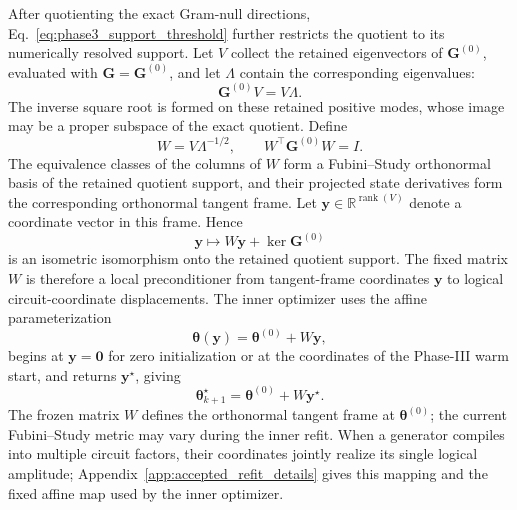 \documentclass[
  reprint,
  amsmath,
  amssymb,
  aps,
  pra,
  nofootinbib,
  superscriptaddress,
  floatfix
]{revtex4-2}
\begin{document}
After quotienting the exact Gram-null directions,
Eq.~\eqref{eq:phase3_support_threshold} further restricts the quotient to its
numerically resolved support. Let \(V\) collect the retained eigenvectors of
\(\mathbf G^{(0)}\), evaluated with \(\mathbf G=\mathbf G^{(0)}\), and let
\(\Lambda\) contain the corresponding eigenvalues:
\[
\mathbf G^{(0)}V=V\Lambda.
\]
The inverse square root is formed on these retained positive modes, whose
image may be a proper subspace of the exact quotient. Define
\begin{equation}
W=V\Lambda^{-1/2},
\qquad
W^{\top}\mathbf G^{(0)}W=I.
\label{eq:accepted_refit_whitening}
\end{equation}
The equivalence classes of the columns of \(W\) form a Fubini--Study
orthonormal basis of the retained quotient support, and their projected state
derivatives form the corresponding orthonormal tangent frame. Let
\(\mathbf y\in\mathbb R^{\operatorname{rank}(V)}\) denote a coordinate vector
in this frame. Hence
\[
\mathbf y
\longmapsto
W\mathbf y+\ker\mathbf G^{(0)}
\]
is an isometric isomorphism onto the retained quotient support. The fixed
matrix \(W\) is therefore a local preconditioner from tangent-frame
coordinates \(\mathbf y\) to logical circuit-coordinate displacements. The
inner optimizer uses the affine parameterization
\[
\boldsymbol\theta(\mathbf y)
=
\boldsymbol\theta^{(0)}+W\mathbf y,
\]
begins at \(\mathbf y=\mathbf0\) for zero initialization or at the coordinates
of the Phase-III warm start, and returns \(\mathbf y^\star\), giving
\begin{equation}
\boldsymbol\theta_{k+1}^{\star}
=
\boldsymbol\theta^{(0)}+W\mathbf y^\star.
\label{eq:accepted_refit_endpoint}
\end{equation}
The frozen matrix \(W\) defines the orthonormal tangent frame at
\(\boldsymbol\theta^{(0)}\); the current Fubini--Study metric may vary during
the inner refit.
When a generator compiles into multiple circuit factors, their coordinates
jointly realize its single logical amplitude;
Appendix~\ref{app:accepted_refit_details} gives this mapping and the
fixed affine map used by the inner optimizer.
\end{document}
